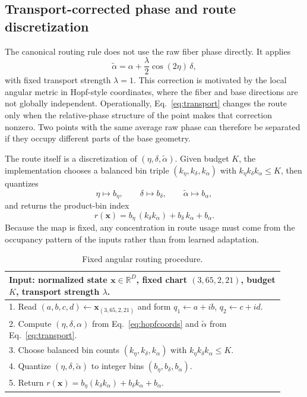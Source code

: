 \documentclass[10pt,letterpaper]{article}
\begin{document}
\subsection{Transport-corrected phase and route discretization}
The canonical routing rule does not use the raw fiber phase directly. It applies
\begin{equation}
\tilde{\alpha} = \alpha + \frac{\lambda}{2}\cos(2\eta)\,\delta,
\label{eq:transport}
\end{equation}
with fixed transport strength $\lambda=1$. This correction is motivated by the local angular metric in Hopf-style coordinates, where the fiber and base directions are not globally independent. Operationally, Eq.~\eqref{eq:transport} changes the route only when the relative-phase structure of the point makes that correction nonzero. Two points with the same average raw phase can therefore be separated if they occupy different parts of the base geometry.

The route itself is a discretization of $(\eta,\delta,\tilde{\alpha})$. Given budget $K$, the implementation chooses a balanced bin triple $(k_\eta,k_\delta,k_\alpha)$ with $k_\eta k_\delta k_\alpha \leq K$, then quantizes
\begin{equation}
\eta \mapsto b_\eta,\qquad \delta \mapsto b_\delta,\qquad \tilde{\alpha} \mapsto b_\alpha,
\end{equation}
and returns the product-bin index
\begin{equation}
r(\mathbf{x}) = b_\eta\,(k_\delta k_\alpha) + b_\delta\,k_\alpha + b_\alpha.
\end{equation}
Because the map is fixed, any concentration in route usage must come from the occupancy pattern of the inputs rather than from learned adaptation.

\begin{table}[t]
  \centering
  \caption{Fixed angular routing procedure.}
  \label{alg:routing}
  \small
  \setlength{\tabcolsep}{4pt}
  \renewcommand{\arraystretch}{1.03}
  \begin{tabular}{p{0.92\linewidth}}
  \toprule
  \textbf{Input:} normalized state $\mathbf{x}\in\mathbb{R}^D$, fixed chart $(3,65,2,21)$, budget $K$, transport strength $\lambda$. \\
  \midrule
  1. Read $(a,b,c,d) \gets \mathbf{x}_{(3,65,2,21)}$ and form $q_1 \gets a+ib$, $q_2 \gets c+id$. \\
  2. Compute $(\eta,\delta,\alpha)$ from Eq.~\eqref{eq:hopfcoords} and $\tilde{\alpha}$ from Eq.~\eqref{eq:transport}. \\
  3. Choose balanced bin counts $(k_\eta,k_\delta,k_\alpha)$ with $k_\eta k_\delta k_\alpha \leq K$. \\
  4. Quantize $(\eta,\delta,\tilde{\alpha})$ to integer bins $(b_\eta,b_\delta,b_\alpha)$. \\
  5. Return $r(\mathbf{x}) = b_\eta(k_\delta k_\alpha) + b_\delta k_\alpha + b_\alpha$. \\
  \bottomrule
  \end{tabular}
\end{table}
\end{document}

